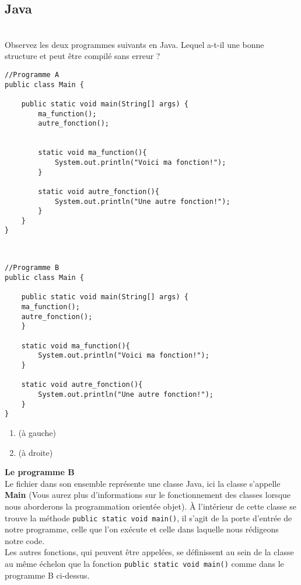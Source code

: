 \subsection{Java}


\begin{Exercice}[3 minutes] \\
Observez les deux programmes suivants en Java. Lequel a-t-il une bonne structure et peut être compilé sans erreur ?

\begin{multicols}{2}
\begin{lstlisting}
//Programme A
public class Main {

    public static void main(String[] args) {
        ma_function();
        autre_fonction();
    

        static void ma_function(){
            System.out.println("Voici ma fonction!");
        }
    
        static void autre_fonction(){
            System.out.println("Une autre fonction!");
        }
    }
}



\end{lstlisting}
\columnbreak

\begin{lstlisting}
//Programme B
public class Main {

    public static void main(String[] args) {
    ma_function();
    autre_fonction();
    }

    static void ma_function(){
        System.out.println("Voici ma fonction!");
    }

    static void autre_fonction(){
        System.out.println("Une autre fonction!");
    }
}
\end{lstlisting}
\columnbreak

\end{multicols}
\begin{enumerate}[label=\Alph*]
    \item (à gauche)
    \item (à droite)
\end{enumerate}
\begin{solution}
    \textbf{Le programme B}\\
    Le fichier dans son ensemble représente une classe Java, ici la classe s'appelle \textbf{Main} (Vous aurez plus d'informations sur le fonctionnement des classes lorsque nous aborderons la programmation orientée objet). À l'intérieur de cette classe se trouve la méthode \lstinline{public static void main()}, il s'agit de la porte d'entrée de notre programme, celle que l'on exécute et celle dans laquelle nous rédigeons notre code.\\
    Les autres fonctions, qui peuvent être appelées, se définissent au sein de la classe au même échelon que la fonction \lstinline{public static void main()} comme dans le programme B ci-dessus. 
\end{solution}
\end{Exercice}

